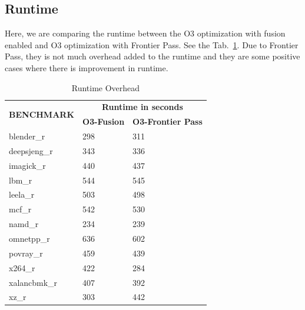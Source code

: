\subsection{Runtime}
Here, we are comparing the runtime between the O3 optimization with fusion enabled and O3 optimization with Frontier Pass. See the Tab.~\ref{tab:dist:fpruntime}. Due to Frontier Pass,  they is not much overhead added to the runtime and they are some positive cases where there is improvement in runtime.



\begin{table}[h]
\begin{tabular}{|l|l|l|}
\hline
\multirow{2}{*}{\textbf{BENCHMARK}} & \multicolumn{2}{c|}{\textbf{Runtime in seconds}} \\ \cline{2-3} 
 & \textbf{O3-Fusion} & \textbf{O3-Frontier Pass} \\ \hline
blender\_r & 298 & 311 \\ \hline
deepsjeng\_r & 343 & 336 \\ \hline
imagick\_r & 440 & 437 \\ \hline
lbm\_r & 544 & 545 \\ \hline
leela\_r & 503 & 498 \\ \hline
mcf\_r & 542 & 530 \\ \hline
namd\_r & 234 & 239 \\ \hline
omnetpp\_r & 636 & 602 \\ \hline
povray\_r & 459 & 439 \\ \hline
x264\_r & 422 & 284 \\ \hline
xalancbmk\_r & 407 & 392 \\ \hline
xz\_r & 303 & 442 \\ \hline
\end{tabular}
\centering
\caption{Runtime Overhead}
\label{tab:dist:fpruntime}
\end{table}



